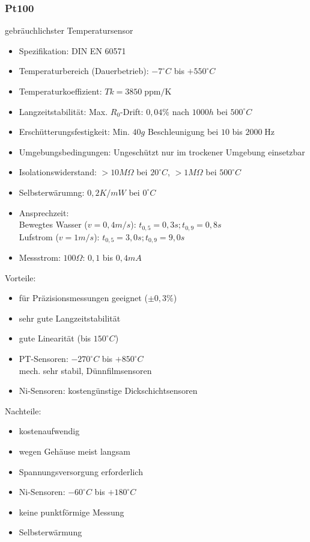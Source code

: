 \subsubsection{Pt100}
gebräuchlichster Temperatursensor
\begin{itemize}
\item Spezifikation: DIN EN 60571
\item Temperaturbereich (Dauerbetrieb): $-7^\circ C$ bis $+550^\circ C$
\item Temperaturkoeffizient: $Tk=3850 \;\mathrm{ppm/K}$
\item Langzeitstabilität: Max. $R_0$-Drift: $0,04\%$ nach $1000h$ bei $500^\circ C$
\item Erschütterungsfestigkeit: Min. $40g$ Beschleunigung bei $10$ bis $2000\;\mathrm{Hz}$
\item Umgebungsbedingungen: Ungeschützt nur im trockener Umgebung einsetzbar
\item Isolationswiderstand: $>10 M\Omega$ bei $20^\circ C$, $>1 M\Omega$ bei $500^\circ C$
\item Selbsterwärumng: $0,2K/mW$ bei $0^\circ C$
\item Ansprechzeit: \\
Bewegtes Wasser ($v=0,4m/s$): $t_{0,5}=0,3s; t_{0,9}=0,8s$\\
Lufstrom ($v=1m/s$): $t_{0,5}=3,0s;t_{0,9}=9,0s$
\item Messstrom: $100 \Omega$: $0,1$ bis $0,4 mA$
\end{itemize}
Vorteile:
\begin{itemize}[label=$+$]
\item für Präzisionsmessungen geeignet ($\pm 0,3\%$)
\item sehr gute Langzeitstabilität
\item gute Linearität (bis $150^\circ C$)
\item PT-Sensoren: $-270^\circ C$ bis $+850^\circ C$\\
mech. sehr stabil, Dünnfilmsensoren
\item Ni-Sensoren: kostengünstige Dickschichtsensoren
\end{itemize}
Nachteile:
\begin{itemize}[label=$-$]
\item kostenaufwendig
\item wegen Gehäuse meist langsam
\item Spannungsversorgung erforderlich
\item Ni-Sensoren: $-60^\circ C$ bis $+180^\circ C$
\item keine punktförmige Messung
\item Selbsterwärmung
\end{itemize}
